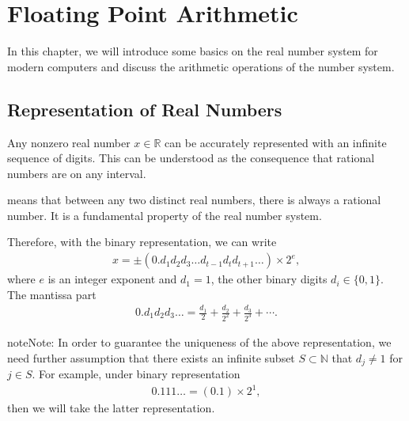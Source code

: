 \documentclass[letterpaper,10pt,english]{jupyterBook}
\begin{document}
\sphinxstepscope


\chapter{Floating Point Arithmetic}
\label{\detokenize{floating_point:floating-point-arithmetic}}\label{\detokenize{floating_point::doc}}
\sphinxAtStartPar
In this chapter, we will introduce some basics on the real number system for modern computers and discuss the arithmetic operations of the number system.


\section{Representation of Real Numbers}
\label{\detokenize{floating_point:representation-of-real-numbers}}
\sphinxAtStartPar
Any nonzero real number \(x\in \mathbb{R}\) can be accurately represented with an infinite sequence of digits. This can be understood as the consequence that rational numbers are  on any interval.

\begin{sphinxShadowBox}

\sphinxAtStartPar
{} means that between any two distinct real numbers, there is always a rational number. It is a fundamental property of the real number system.
\end{sphinxShadowBox}

\sphinxAtStartPar
Therefore, with the binary representation, we can write
\begin{equation*}
\begin{split}
x = \pm (0.d_1 d_2 d_3\dots d_{t-1} d_t d_{t+1}\dots) \times 2^e,
\end{split}
\end{equation*}
\sphinxAtStartPar
where \(e\) is an integer exponent and \(d_1=1\), the other binary digits \(d_i\in \{0, 1\}\). The mantissa part
\begin{equation*}
\begin{split}
0.d_1 d_2 d_3\dots =  \frac{d_1}{2} + \frac{d_2}{2^2} + \frac{d_3}{2^3} + \cdots.
\end{split}
\end{equation*}
\begin{sphinxadmonition}{note}{Note:}
\sphinxAtStartPar
In order to guarantee the uniqueness of the above representation, we need further assumption that there exists an infinite subset \(S\subset \mathbb{N}\) that \(d_j\neq 1\) for \(j\in S\). For example, under binary representation
\begin{equation*}
\begin{split}0.111\dots = (0.1)\times 2^1,\end{split}
\end{equation*}
\sphinxAtStartPar
then we will take the latter representation.
\end{sphinxadmonition}
\end{document}
